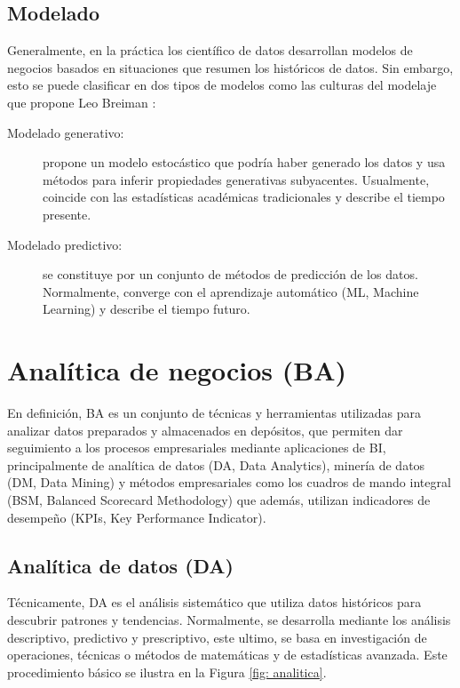\documentclass[12pt,jou]{apa7}
\begin{document}
\subsection{Modelado}
Generalmente, en la práctica los científico de datos desarrollan modelos de negocios basados en situaciones que resumen los históricos de datos. Sin embargo, esto se puede clasificar en dos tipos de modelos como las culturas del modelaje que propone Leo Breiman \cite{DonoD}:

\begin{description}
	\item[Modelado generativo:] propone un modelo estocástico que podría haber generado los datos y usa métodos para inferir propiedades generativas subyacentes. Usualmente, coincide con las estadísticas académicas tradicionales y  describe el tiempo presente.
	
	\item[Modelado predictivo:] se constituye por un conjunto de métodos de predicción de los datos. Normalmente, converge con el aprendizaje automático (ML, Machine Learning) y describe el tiempo futuro.
\end{description}

\section{Analítica de negocios (BA)}

En definición, BA es un conjunto de técnicas y herramientas utilizadas para analizar datos preparados y almacenados en depósitos, que permiten dar seguimiento a los procesos empresariales mediante aplicaciones de BI, principalmente de analítica de datos (DA, Data Analytics), minería de datos (DM, Data Mining) y métodos empresariales como los cuadros de mando integral (BSM, Balanced Scorecard Methodology) que además, utilizan indicadores de desempeño (KPIs, Key Performance Indicator).

\subsection{Analítica de datos (DA)}
Técnicamente, DA es el análisis sistemático que utiliza datos históricos para descubrir patrones y tendencias. Normalmente, se desarrolla mediante los análisis descriptivo, predictivo y prescriptivo, este ultimo, se basa en investigación de operaciones, técnicas o métodos de matemáticas y de estadísticas avanzada. Este procedimiento básico se ilustra en la Figura \ref{fig: analitica}.
\end{document}
